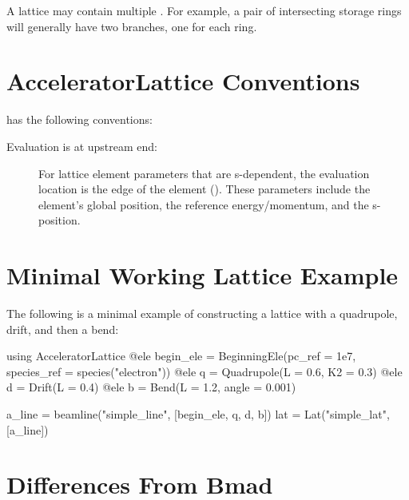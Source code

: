A lattice may contain multiple  . For example, a pair of intersecting storage
rings will generally have two  branches, one for each ring.

\section{AcceleratorLattice Conventions}
\label{s:conventions}

\accellat has the following conventions:
\begin{description}
%
\item[Evaluation is at upstream end:] 
For lattice element parameters that are s-dependent, the evaluation location is the
 edge of the element (). These parameters include the 
element's global position, the reference energy/momentum, and the s-position.
%
\end{description}

\section{Minimal Working Lattice Example}
\label{s:min.lat}

The following is a minimal example of constructing a lattice with a quadrupole, drift, and then
a bend:
\begin{example}
  using AcceleratorLattice
  @ele begin_ele = BeginningEle(pc_ref = 1e7, species_ref = species("electron"))
  @ele q = Quadrupole(L = 0.6, K2 = 0.3)
  @ele d = Drift(L = 0.4)
  @ele b = Bend(L = 1.2, angle = 0.001)

  a_line = beamline("simple_line", [begin_ele, q, d, b])
  lat = Lat("simple_lat", [a_line])
\end{example}

\section{Differences From Bmad}

